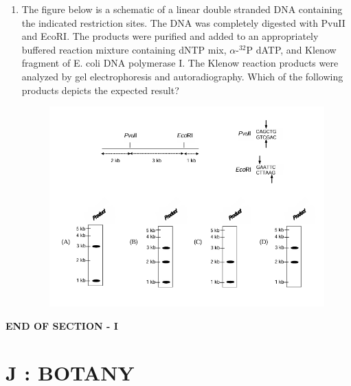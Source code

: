 \documentclass[journal,12pt,onecolumn]{IEEEtran}
\begin{document}
\begin{enumerate}[label=\arabic*.]
\item The figure below is a schematic of a linear double stranded DNA containing the indicated restriction sites. The DNA was completely digested with PvuII and EcoRI. The products were purified and added to an appropriately buffered reaction mixture containing dNTP mix, $\alpha$-$^{32}$P dATP, and Klenow fragment of E. coli DNA polymerase I. The Klenow reaction products were analyzed by gel electrophoresis and autoradiography. Which of the following products depicts the expected result?\\
\begin{figure}[H]
    \centering
    \includegraphics[width=0.7\columnwidth]{FIG/I-20.png}
    \caption*{}
    \label{fig:I-20}
\end{figure}


\end{enumerate}

\begin{center}
\textbf{END OF SECTION - I}
\end{center}
\newpage
\section*{\centering J : BOTANY}
\end{document}
